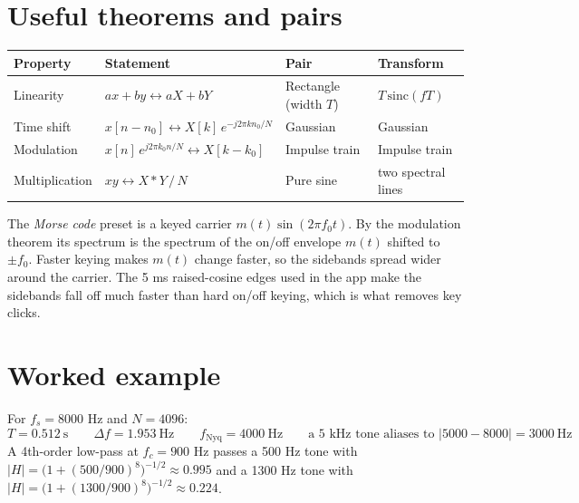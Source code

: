 \documentclass[10pt,a4paper]{article}
\newcommand{\bin}{\Delta f}
\begin{document}
\section{Useful theorems and pairs}
\begin{center}
\begin{tabular}{@{}l l@{\qquad}l l@{}}
\toprule
Property & Statement & Pair & Transform\\
\midrule
Linearity & $ax + by \leftrightarrow aX + bY$ & Rectangle (width $T$) & $T\,\mathrm{sinc}(fT)$\\
Time shift & $x[n-n_0] \leftrightarrow X[k]\,e^{-j2\pi kn_0/N}$ & Gaussian & Gaussian\\
Modulation & $x[n]\,e^{j2\pi k_0 n/N} \leftrightarrow X[k-k_0]$ & Impulse train & Impulse train\\
Multiplication & $xy \leftrightarrow X * Y\,/\,N$ & Pure sine & two spectral lines\\
\bottomrule
\end{tabular}
\end{center}
The \emph{Morse code} preset is a keyed carrier $m(t)\sin(2\pi f_0 t)$. By the modulation theorem its spectrum is the spectrum of the on/off envelope $m(t)$ shifted to $\pm f_0$. Faster keying makes $m(t)$ change faster, so the sidebands spread wider around the carrier. The 5 ms raised-cosine edges used in the app make the sidebands fall off much faster than hard on/off keying, which is what removes key clicks.

\section{Worked example}
For $f_s = 8000$ Hz and $N = 4096$:
\[
T = 0.512\ \mathrm{s}
\qquad
\bin = 1.953\ \mathrm{Hz}
\qquad
f_{\mathrm{Nyq}} = 4000\ \mathrm{Hz}
\qquad
\text{a 5 kHz tone aliases to } |5000 - 8000| = 3000\ \mathrm{Hz}
\]
A 4th-order low-pass at $f_c = 900$ Hz passes a 500 Hz tone with
$|H| = \bigl(1 + (500/900)^8\bigr)^{-1/2} \approx 0.995$ and a 1300 Hz tone with $|H| = \bigl(1 + (1300/900)^8\bigr)^{-1/2} \approx 0.224$.
\end{document}
